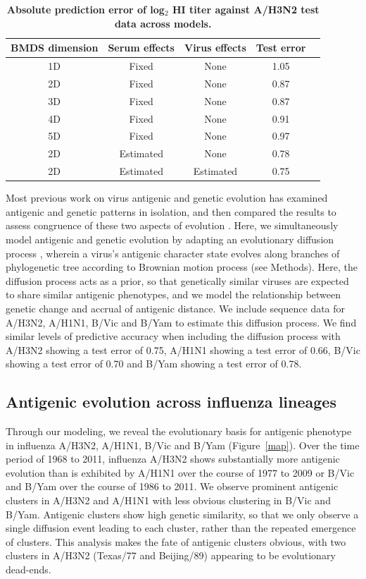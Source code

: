 \documentclass[11pt,oneside,letterpaper]{article}
\begin{document}
\begin{table}[h]
	\centering
	\caption{\textbf{Absolute prediction error of log$_2$ HI titer against A/H3N2 test data across models.}}
	\label{errortable}		
	\begin{tabular}{ c c c c c } 
	\hline
	BMDS dimension 	& 	Serum effects 	&	Virus effects	& 	Test error	\\
	\hline	
	1D 				&	Fixed 			&	None			&	1.05		\\	
	2D 				&	Fixed 			&	None			&	0.87 		\\
	3D 				&	Fixed 			&	None			&	0.87		\\
	4D 				&	Fixed 			&	None			&	0.91		\\
	5D 				&	Fixed 			&	None			&	0.97		\\	
	2D 				&	Estimated 		&	None			&	0.78		\\	
	2D 				&	Estimated 		&	Estimated		&	0.75		\\		
	\hline
	\end{tabular}
\end{table}

Most previous work on virus antigenic and genetic evolution has examined antigenic and genetic patterns in isolation, and then compared the results to assess congruence of these two aspects of evolution \cite{Hay01,Smith04,Russell08}. 
Here, we simultaneously model antigenic and genetic evolution by adapting an evolutionary diffusion process \cite{Lemey10}, wherein a virus's antigenic character state evolves along branches of phylogenetic tree according to Brownian motion process (see Methods).
Here, the diffusion process acts as a prior, so that genetically similar viruses are expected to share similar antigenic phenotypes, and we model the relationship between genetic change and accrual of antigenic distance.
We include sequence data for A/H3N2, A/H1N1, B/Vic and B/Yam to estimate this diffusion process.
We find similar levels of predictive accuracy when including the diffusion process with A/H3N2 showing a test error of 0.75, A/H1N1 showing a test error of 0.66, B/Vic showing a test error of 0.70 and B/Yam showing a test error of 0.78.

\subsection*{Antigenic evolution across influenza lineages}

Through our modeling, we reveal the evolutionary basis for antigenic phenotype in influenza A/H3N2, A/H1N1, B/Vic and B/Yam (Figure~\ref{map}).
Over the time period of 1968 to 2011, influenza A/H3N2 shows substantially more antigenic evolution than is exhibited by A/H1N1 over the course of 1977 to 2009 or B/Vic and B/Yam over the course of 1986 to 2011.
We observe prominent antigenic clusters in A/H3N2 and A/H1N1 with less obvious clustering in B/Vic and B/Yam.
Antigenic clusters show high genetic similarity, so that we only observe a single diffusion event leading to each cluster, rather than the repeated emergence of clusters.
This analysis makes the fate of antigenic clusters obvious, with two clusters in A/H3N2 (Texas/77 and Beijing/89) appearing to be evolutionary dead-ends.
\end{document}

